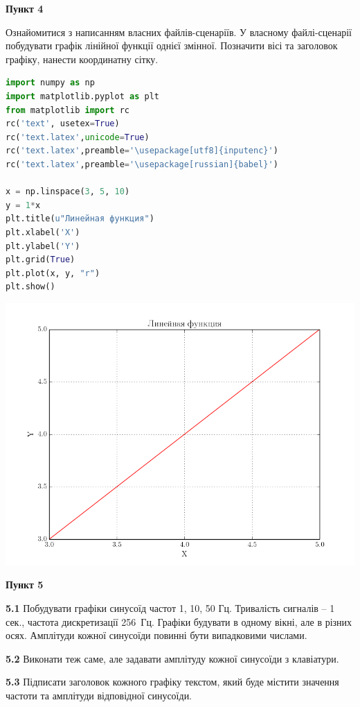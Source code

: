 \documentclass[a4paper,12pt]{article}
\begin{document}
\begin{center}
\textbf{Пункт 4}\par
\end{center}
Ознайомитися з написанням власних файлів-сценаріїв. У власному файлі-сценарії побудувати графік лінійної функції однієї змінної. Позначити вісі та заголовок графіку, нанести координатну сітку.\par
\begin{lstlisting}[language=Python]
import numpy as np
import matplotlib.pyplot as plt
from matplotlib import rc
rc('text', usetex=True)
rc('text.latex',unicode=True)
rc('text.latex',preamble='\usepackage[utf8]{inputenc}')
rc('text.latex',preamble='\usepackage[russian]{babel}')

x = np.linspace(3, 5, 10)
y = 1*x
plt.title(u"Линейная функция")
plt.xlabel('X')
plt.ylabel('Y')
plt.grid(True)
plt.plot(x, y, "r")
plt.show()
\end{lstlisting}
\begin{center}
\includegraphics[height = 12 cm,width=14 cm]{4f.png}
\end{center}
\vspace{1cm}\par



\begin{center}
\textbf{Пункт 5}\par
\end{center}
\textbf{5.1} Побудувати графіки синусоїд частот 1, 10, 50 Гц. Тривалість сигналів – 1 сек., частота дискретизації 256 Гц. Графіки будувати в одному вікні, але в різних осях. Амплітуди кожної синусоїди повинні бути випадковими числами.\par
\textbf{5.2} Виконати теж саме, але  задавати амплітуду кожної синусоїди з клавіатури.\par
\textbf{5.3} Підписати заголовок кожного графіку текстом, який буде містити значення частоти та амплітуди відповідної синусоїди.\par
\lstset{language=Python}          %
\end{document}
